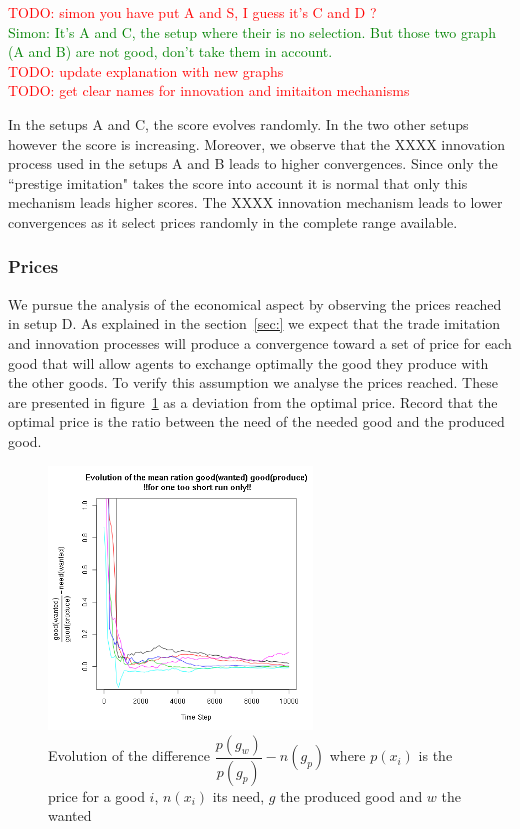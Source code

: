 \documentclass{wscpaperproc}
\newcommand{\memo}[2]{\textcolor{#1}{#2}}
\newcommand{\todo}[1]{\memo{red}{TODO: #1\\}}
\newcommand{\simon}[1]{\memo{green}{Simon: #1\\}}
\begin{document}
\todo{simon you have put A and S, I guess it's C and D ?}
\simon{It's A and C, the setup where their is no selection. But those two graph (A and B) are not good, don't take them in account. }
\todo{update explanation with new graphs}
\todo{get clear names for innovation and imitaiton mechanisms}
 
In the setups A and C, the score evolves randomly. In the two other setups however the score is increasing. Moreover, we observe that the XXXX innovation process used in the setups A and B leads to higher convergences. Since only the ``prestige imitation" takes the score into account it is normal that only this mechanism leads higher scores. The XXXX innovation mechanism leads to lower convergences as it select prices randomly in the complete range available.

\subsubsection{Prices}

We pursue the analysis of the economical aspect by observing the prices reached in setup D. As explained in the section~\ref{sec:} we expect that the trade imitation and innovation processes will produce a convergence toward a set of price for each good that will allow agents to exchange optimally the good they produce with the other goods. To verify this assumption we analyse the prices reached. These are presented in figure~\ref{fig:ratioEvol} as a deviation from the optimal price. Record that the optimal price is the ratio between the need of the needed good and the produced good.

\begin{figure}[H]
	\begin{center}
		\includegraphics[width=7cm]{img/ratioEvol.png}
	\end{center}
	\caption{Evolution of the difference $\dfrac{p(g_w)}{p(g_p)}-n(g_p)$ where $p(x_i)$ is the price for a good $i$, $n(x_i)$ its need, $g$ the produced good and $w$ the wanted}
	\label{fig:ratioEvol}
\end{figure}
\end{document}
